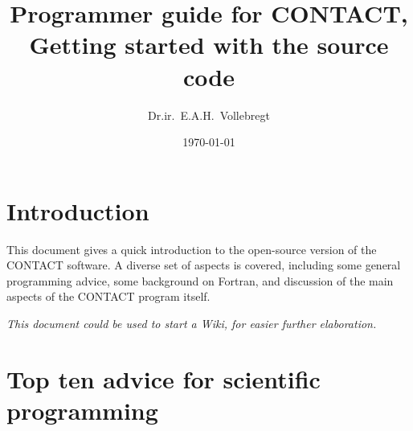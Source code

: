 \documentclass[12pt]{report}
\title{Programmer guide for CONTACT, Getting started with the source code}
\author{Dr.ir.\ E.A.H.\ Vollebregt}
\date{\today}
\begin{document}
\maketitle

\vspace{2ex} %


\chapter{Introduction}

This document gives a quick introduction to the open-source version of the
CONTACT software. A diverse set of aspects is covered, including some
general programming advice, some background on Fortran, and discussion of
the main aspects of the CONTACT program itself.

{\em This document could be used to start a Wiki, for easier further
elaboration.}

\chapter{Top ten advice for scientific programming}
\end{document}
